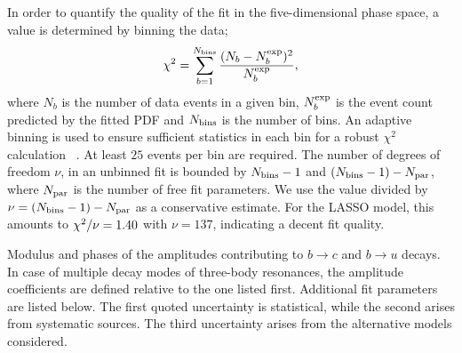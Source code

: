 In order to quantify the quality of the fit in the five-dimensional phase space,
a \chisq value is determined by binning the data;
\begin{equation}
	\chi^{2} = \sum_{b=1}^{N_{\rm bins}} \frac{(N_{b}-N_{b}^{\rm exp})^{2}}{N_{b}^{\rm exp}},
\end{equation}
where $N_{b}$ is the number of data events in a given bin, 
$N_{b}^{\rm exp}$ is the event count predicted by the fitted PDF
and $N_{\rm bins}$ is the number of bins.
An adaptive binning
is used to ensure sufficient statistics in each bin for a robust $\chi^{2}$ calculation ~\cite{KKpipi}.
At least $25$ events per bin are required.
The number of degrees of freedom $\nu$, in an unbinned fit is bounded by $N_{\rm bins}-1$ and $(N_{\rm bins}- 1) - N_{\rm par}$, 
where $N_{\rm par}$ is the number of free fit parameters.
We use the \chisq value divided by $\nu = (N_{\rm bins}-1) - N_{\rm par}$ as a conservative estimate.
For the LASSO model, this 
amounts to $\chi^2/\nu = 1.40$ with $\nu = 137$,
indicating a decent fit quality.

\begin{table}[h]
\centering
\caption{
\small
Modulus and phases of the amplitudes contributing to $b \to c$ and $b \to u$ decays.
In case of multiple decay modes of three-body resonances, the amplitude coefficients are defined relative to the one listed first.
Additional fit parameters are listed below.
The first quoted uncertainty is statistical, while the second arises from systematic sources. 
The third uncertainty arises from the alternative models considered.
}
\resizebox{\linewidth}{!}{
	\renewcommand{\arraystretch}{1.5}
	
}
\label{tab:fullResult}
\end{table}

\clearpage


